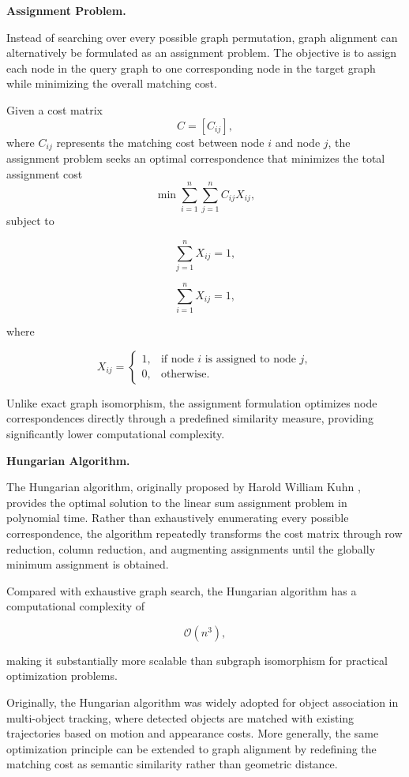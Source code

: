 \documentclass[a4paper, 11pt]{article} %
\begin{document}
\textbf{Assignment Problem.}

Instead of searching over every possible graph permutation, graph alignment can alternatively be formulated as an assignment problem. The objective is to assign each node in the query graph to one corresponding node in the target graph while minimizing the overall matching cost.

Given a cost matrix \[C=[C_{ij}],\] where \(C_{ij}\) represents the matching cost between node
\(i\)
and node
\(j\),
the assignment problem seeks an optimal correspondence that minimizes the total assignment cost\[\min\sum_{i=1}^{n}\sum_{j=1}^{n}C_{ij}X_{ij},\] subject to

\[
\sum_{j=1}^{n}X_{ij}=1,
\]

\[
\sum_{i=1}^{n}X_{ij}=1,
\]

where

\[
X_{ij}=
\begin{cases}
1,&\text{if node }i\text{ is assigned to node }j,\\
0,&\text{otherwise}.
\end{cases}
\]

Unlike exact graph isomorphism, the assignment formulation optimizes node correspondences directly through a predefined similarity measure, providing significantly lower computational complexity.

\textbf{Hungarian Algorithm.}

The Hungarian algorithm, originally proposed by Harold William Kuhn \cite{kuhn1955hungarian}, provides the optimal solution to the linear sum assignment problem in polynomial time. Rather than exhaustively enumerating every possible correspondence, the algorithm repeatedly transforms the cost matrix through row reduction, column reduction, and augmenting assignments until the globally minimum assignment is obtained.

Compared with exhaustive graph search, the Hungarian algorithm has a computational complexity of

\[
\mathcal{O}(n^3),
\]

making it substantially more scalable than subgraph isomorphism for practical optimization problems.

Originally, the Hungarian algorithm was widely adopted for object association in multi-object tracking, where detected objects are matched with existing trajectories based on motion and appearance costs. More generally, the same optimization principle can be extended to graph alignment by redefining the matching cost as semantic similarity rather than geometric distance.
\end{document}
